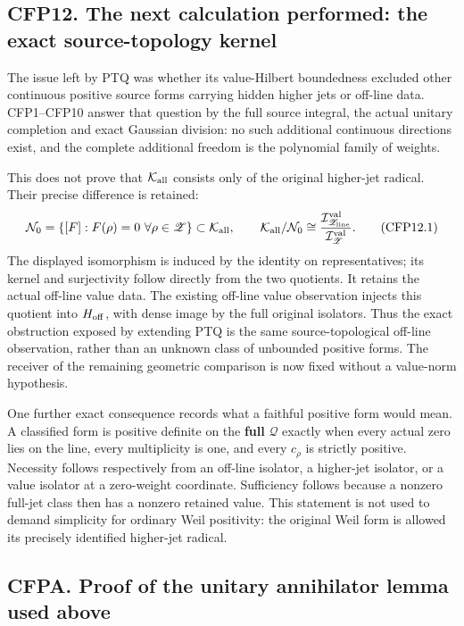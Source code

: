 \subsection{CFP12. The next calculation performed: the exact
source-topology
kernel}\label{cfp12.-the-next-calculation-performed-the-exact-source-topology-kernel}

The issue left by PTQ was whether its value-Hilbert boundedness excluded
other continuous positive source forms carrying hidden higher jets or
off-line data. CFP1--CFP10 answer that question by the full source
integral, the actual unitary completion and exact Gaussian division: no
such additional continuous directions exist, and the complete additional
freedom is the polynomial family of weights.

This does not prove that \(\mathcal K_{\rm all}\) consists only of the
original higher-jet radical. Their precise difference is retained: \[
\mathcal N_0=\{[F]:F(\rho)=0\ \forall\rho\in\mathscr Z\}
\subset\mathcal K_{\rm all},
\qquad
\mathcal K_{\rm all}/\mathcal N_0
\cong\frac{\mathcal I_{\mathscr Z_{\rm line}}^{\rm val}}
{\mathcal I_{\mathscr Z}^{\rm val}}.
\tag{CFP12.1}
\] The displayed isomorphism is induced by the identity on
representatives; its kernel and surjectivity follow directly from the
two quotients. It retains the actual off-line value data. The existing
off-line value observation injects this quotient into \(H_{\rm off}\),
with dense image by the full original isolators. Thus the exact
obstruction exposed by extending PTQ is the same source-topological
off-line observation, rather than an unknown class of unbounded positive
forms. The receiver of the remaining geometric comparison is now fixed
without a value-norm hypothesis.

One further exact consequence records what a faithful positive form
would mean. A classified form is positive definite on the \textbf{full}
\(\mathcal Q\) exactly when every actual zero lies on the line, every
multiplicity is one, and every \(c_\rho\) is strictly positive.
Necessity follows respectively from an off-line isolator, a higher-jet
isolator, or a value isolator at a zero-weight coordinate. Sufficiency
follows because a nonzero full-jet class then has a nonzero retained
value. This statement is not used to demand simplicity for ordinary Weil
positivity: the original Weil form is allowed its precisely identified
higher-jet radical.

\subsection{CFPA. Proof of the unitary annihilator lemma used
above}\label{cfpa.-proof-of-the-unitary-annihilator-lemma-used-above}

